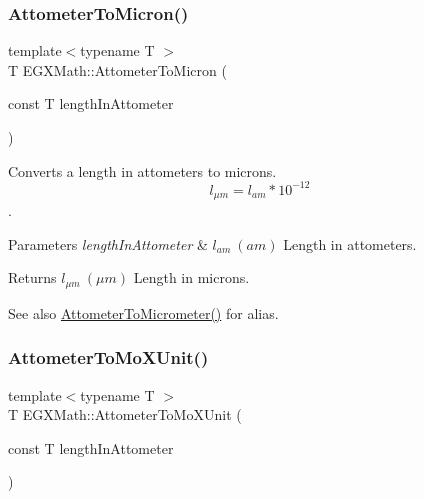 \subsubsection{\texorpdfstring{Attometer\+To\+Micron()}{AttometerToMicron()}}
{\footnotesize\ttfamily template$<$typename T $>$ \\
T E\+G\+X\+Math\+::\+Attometer\+To\+Micron (\begin{DoxyParamCaption}\item[{const T}]{length\+In\+Attometer }\end{DoxyParamCaption})}



Converts a length in attometers to microns. \[ l_{\mu m}=l_{am} * 10^{-12} \]. 


\begin{DoxyParams}{Parameters}
{\em length\+In\+Attometer} & $ l_{am}\ (am)$ Length in attometers. \\
\hline
\end{DoxyParams}
\begin{DoxyReturn}{Returns}
$ l_{\mu m}\ (\mu m)$ Length in microns. 
\end{DoxyReturn}
\begin{DoxySeeAlso}{See also}
\mbox{\hyperlink{group___e_g_x_math-_conversions-_length_conversions-_s_i-_attometer-_s_i_gaa98a14657ea865a6cac8fb8fc42172a2}{Attometer\+To\+Micrometer()}} for alias. 
\end{DoxySeeAlso}
\mbox{\label{group___e_g_x_math-_conversions-_length_conversions-_s_i-_attometer-_non-_s_i_ga79ec6f4ec4a97af05fe8f69b80805ab7}} 
\subsubsection{\texorpdfstring{Attometer\+To\+Mo\+X\+Unit()}{AttometerToMoXUnit()}}
{\footnotesize\ttfamily template$<$typename T $>$ \\
T E\+G\+X\+Math\+::\+Attometer\+To\+Mo\+X\+Unit (\begin{DoxyParamCaption}\item[{const T}]{length\+In\+Attometer }\end{DoxyParamCaption})}



